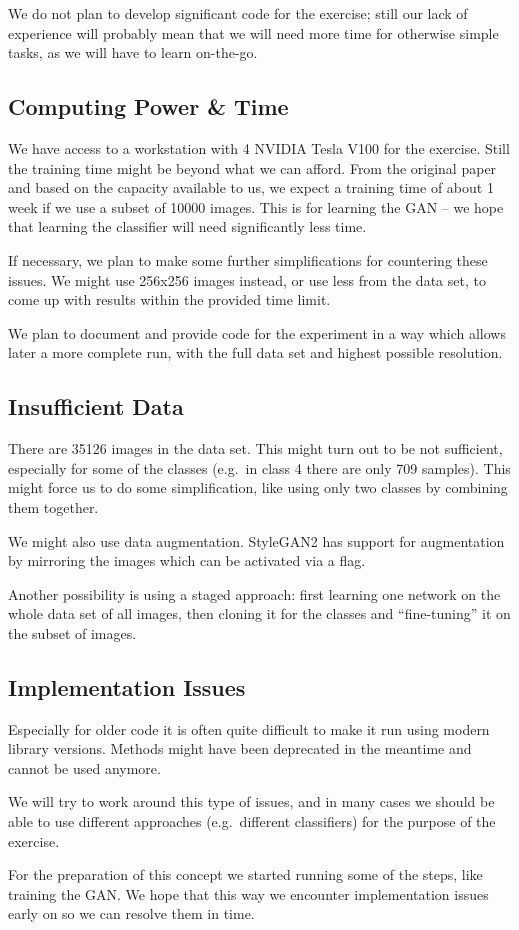 \documentclass[sigconf,nonacm]{acmart}
\begin{document}
We do not plan to develop significant code for the exercise; still
our lack of experience will probably mean that we will need
more time for otherwise simple tasks, as we will have to
learn on-the-go.

\subsection{Computing Power \& Time}

We have access to a workstation with 4 NVIDIA Tesla V100 for
the exercise.
Still the training time might be beyond what we can afford.
From the original paper and based on the capacity available
to us, we expect a training time of about 1 week if we use
a subset of \SI{10000}{} images.
This is for learning the GAN -- we hope that learning the
classifier will need significantly less time.

If necessary, we plan to make some further simplifications for
countering these issues.
We might use 256x256 images instead, or use less from the data set,
to come up with results within the provided time limit.

We plan to document and provide code for the experiment in a way
which allows later a more complete run, with the full data set
and highest possible resolution.

\subsection{Insufficient Data}

There are \SI{35126}{} images in the data set.
This might turn out to be not
sufficient, especially for some of the classes (e.g.\ in class 4
there are only 709 samples).
This might force us to do some simplification, like using only two
classes by combining them together.

We might also use data augmentation. StyleGAN2 has support for
augmentation by mirroring the images which can be activated
via a flag.

Another possibility is using a staged approach: first learning
one network on the whole data set of all images, then
cloning it for the classes and ``fine-tuning'' it on the subset
of images.

\subsection{Implementation Issues}

Especially for older code it is often quite difficult to
make it run using modern library versions.
Methods might have been deprecated in the meantime and cannot
be used anymore.

We will try to work around this type of issues, and in many cases
we should be able to use different approaches (e.g.\ different
classifiers) for the purpose of the exercise.

For the preparation of this concept we started running some
of the steps, like training the GAN.
We hope that this way we encounter implementation issues early on
so we can resolve them in time.



\end{document}
